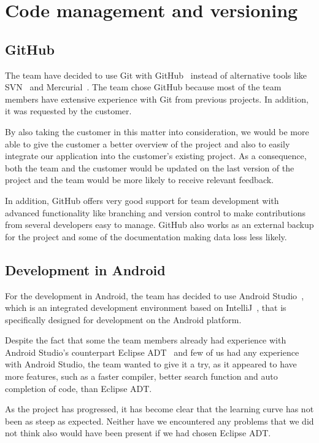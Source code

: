 \section{Code management and versioning}
\subsection{GitHub}
The team have decided to use Git with GitHub~\cite{github} instead of alternative tools like SVN~\cite{svn} and Mercurial~\cite{mercurial}. 
The team chose GitHub because most of the team members have extensive experience with Git from previous projects. In addition, it was requested by the customer. 

By also taking the customer in this matter into consideration, we would be more able to give the customer a better overview of the project and also to easily integrate our application into the customer's existing project. As a consequence, both the team and the customer would be updated on the last version of the project and the team would be more likely to receive relevant feedback. 

In addition, GitHub offers very good support for team development 
with advanced functionality like branching and version control to make contributions from several developers easy 
to manage. GitHub also works as an external backup for the project and some of the documentation making data loss less likely.

\subsection{Development in Android}
For the development in Android, the team has decided to use Android Studio~\cite{android-studio}, which is an integrated development environment based on IntelliJ~\cite{intellij}, that is specifically designed for development on the Android platform.

Despite the fact that some the team members already had experience with Android Studio's counterpart Eclipse ADT~\cite{eclipse} and few of us had any experience with Android Studio, the team wanted to give it a try, as it appeared to have more features, such as a faster compiler, better search function and auto completion of code, than Eclipse ADT. 

As the project has progressed, it has become clear that the learning curve has not been as steep as expected. Neither have we encountered any problems that we did not think also would have been present if we had chosen Eclipse ADT.

